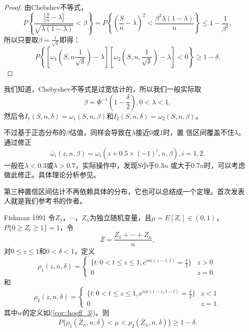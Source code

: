 \begin{proof}
  由Chebshev不等式，
  \begin{equation}
    P\left\{\frac{\left|\frac{S}{n} - \lambda\right|}{\sqrt{\lambda(1
        - \lambda)}} < \beta\right\} = P\left\{(\frac{S}{n} -
    \lambda)^2 < \frac{\beta^2 \lambda (1 - \lambda)}{n}\right\} \leq
    1 -\frac{1}{\beta^2},
    \label{eq::proof_conf_int2}
  \end{equation}
  所以只要取$\beta = \frac{1}{\sqrt{\delta}}$即得：
  \begin{equation}
    P\left\{\left[\omega_1(S, n \frac{1}{\sqrt{\delta}}) -
      \lambda\right]\left[\omega_2(S, n, \frac{1}{\sqrt{\delta}}) -
      \lambda\right] < 0\right\} \geq 1 - \delta.
  \end{equation}
\end{proof}

我们知道，Chebyshev不等式是过宽估计的，所以我们一般实际取
$$
\beta = \Phi^{-1}(1 - \frac{\delta}{2}), 0 < \lambda < 1,
$$
然后令$I_1(S, n, \delta) = \omega_1(S, n, \beta)$和$I_2(S, n,
\delta) = \omega_2(S, n, \beta)$。

不过基于正态分布的$\beta$估值，同样会导致在$\lambda$接近$0$或$1$时，置
信区间覆盖不住$\lambda$。通过修正
\begin{equation}
  \bar{\omega}_i(z, n, \beta) = \omega_i(z + 0.5 \times (-1)^i, n,
  \beta), i = 1, 2.
  \label{eq::con_corr}
\end{equation}
一般在$\lambda < 0.3$或$\lambda > 0.7$，实际操作中，发现$S$小于$0.3n$
或大于$0.7n$时，可以考虑做此修正。具体理论分析参见\cite{Blyth1983Binomial}。

第三种置信区间估计不再依赖具体的分布，它也可以总结成一个定理。首次发表
人就是我们参考书的作者。

\begin{theorem}{\hei Fishman 1991}
  令$Z_1$，$\cdots$，$Z_n$为独立随机变量，且$\mu = E[Z_i] \in (0, 1)$，
  $P\{0 \geq Z_i \geq 1\} = 1$，令
  $$
  \bar{Z} = \frac{Z_1 + \cdots + Z_n}{n},
  $$
  对$0 \leq z \leq 1$和$0 < \delta < 1$，定义
  \begin{equation}
    \rho_1(z, n, \delta) = \left\{ \begin{array}{ll}
      \{t : 0 < t \leq z \leq 1, e^{n w(z - 1, t)} = \frac{\delta}{2} \}& z > 0\\
      0 & z = 0.
      \end{array}
      \right.
      \label{eq::conf_int3_rho_1}
    \end{equation}
    和
    \begin{equation}
      \rho_2(z, n, \delta) = \left\{ \begin{array}{ll}
      \{t : 0 < t \leq z \leq 1, e^{n w(t - z, 1 - t)} = \frac{\delta}{2} \}& z < 1\\
      0 & z = 1.
      \end{array}
      \right.
      \label{eq::conf_int3_rho_1}
      \end{equation}
      其中$w$的定义如(\ref{cor::hoeff_3})。则
      $$
      P\{\rho_1(\bar{Z}_n, n, \delta) < \mu < \rho_2(\bar{Z}_n, n, \delta)\} \geq 1 - \delta.
      $$
    \label{thm::conf_int3}
\end{theorem}

